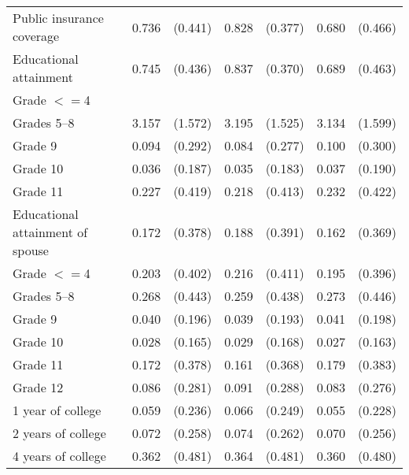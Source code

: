 \begin{tabular}{lcccccc}
 \hspace{0.3cm}  Public insurance coverage  & 0.736 & (0.441)  & 0.828 & (0.377)  & 0.680 & (0.466)  \\
 Educational attainment  & 0.745 & (0.436)  & 0.837 & (0.370)  & 0.689 & (0.463)  \\
 \hspace{0.3cm} Grade $<=$4  & & &  \\
 \hspace{0.3cm}  Grades 5--8  & 3.157 & (1.572)  & 3.195 & (1.525)  & 3.134 & (1.599)  \\
 \hspace{0.3cm} Grade 9  & 0.094 & (0.292)  & 0.084 & (0.277)  & 0.100 & (0.300)  \\
 \hspace{0.3cm} Grade 10  & 0.036 & (0.187)  & 0.035 & (0.183)  & 0.037 & (0.190)  \\
 \hspace{0.3cm} Grade 11  & 0.227 & (0.419)  & 0.218 & (0.413)  & 0.232 & (0.422)  \\
 Educational attainment of spouse  & 0.172 & (0.378)  & 0.188 & (0.391)  & 0.162 & (0.369)  \\
 \hspace{0.3cm} Grade $<=$4  & 0.203 & (0.402)  & 0.216 & (0.411)  & 0.195 & (0.396)  \\
 \hspace{0.3cm}  Grades 5--8  & 0.268 & (0.443)  & 0.259 & (0.438)  & 0.273 & (0.446)  \\
 \hspace{0.3cm} Grade 9  & 0.040 & (0.196)  & 0.039 & (0.193)  & 0.041 & (0.198)  \\
 \hspace{0.3cm} Grade 10  & 0.028 & (0.165)  & 0.029 & (0.168)  & 0.027 & (0.163)  \\
 \hspace{0.3cm} Grade 11  & 0.172 & (0.378)  & 0.161 & (0.368)  & 0.179 & (0.383)  \\
 \hspace{0.3cm} Grade 12  & 0.086 & (0.281)  & 0.091 & (0.288)  & 0.083 & (0.276)  \\
 \hspace{0.3cm} 1 year of college  & 0.059 & (0.236)  & 0.066 & (0.249)  & 0.055 & (0.228)  \\
 \hspace{0.3cm} 2 years of college  & 0.072 & (0.258)  & 0.074 & (0.262)  & 0.070 & (0.256)  \\
 \hspace{0.3cm} 4 years of college  & 0.362 & (0.481)  & 0.364 & (0.481)  & 0.360 & (0.480)  \\

\end{tabular}
